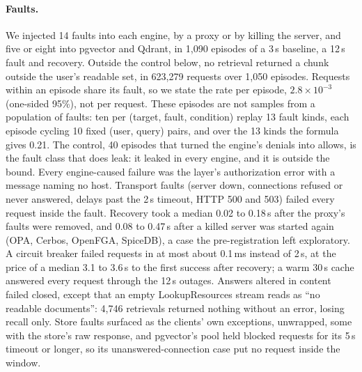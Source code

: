 \paragraph{Faults.}
We injected 14 faults into each engine, by a proxy or by killing the server, and five or eight into
pgvector and Qdrant, in 1,090 episodes of a 3\,s baseline, a 12\,s fault and recovery. Outside the
control below, no retrieval returned a chunk outside the user's readable set, in 623,279 requests over
1,050 episodes. Requests within an episode share its fault, so we state the rate per episode,
$2.8 \times 10^{-3}$ (one-sided 95\%), not per request. These episodes are not samples from a population of faults: ten per (target, fault, condition) replay 13 fault kinds, each episode cycling 10 fixed
(user, query) pairs, and over the 13 kinds the formula gives 0.21. The
control, 40 episodes that turned the engine's denials
into allows, is the fault class that does leak: it leaked in every engine, and it is outside the bound. Every engine-caused failure was the layer's authorization error
with a message naming no host. Transport faults (server down, connections refused or never answered,
delays past the 2\,s timeout, HTTP 500 and 503) failed every request inside the fault. Recovery
took a median 0.02 to 0.18\,s after the proxy's faults were removed, and 0.08 to 0.47\,s after a killed server was started again (OPA, Cerbos, OpenFGA, SpiceDB), a case the pre-registration left exploratory. A circuit breaker failed requests in at most about 0.1\,ms
instead of 2\,s, at the price of a median 3.1 to 3.6\,s to the first success after recovery; a warm
30\,s cache answered every request through the 12\,s outages. Answers altered in content failed
closed, except that an empty LookupResources stream reads as ``no readable documents'': 4,746
retrievals returned nothing without an error, losing recall only. Store faults surfaced as the
clients' own exceptions, unwrapped, some with the store's raw response, and pgvector's pool held
blocked requests for its 5\,s timeout or longer, so its unanswered-connection case put no request
inside the window.

